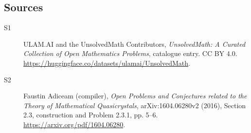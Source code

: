 \documentclass[11pt]{article}
\begin{document}
\subsection{Sources}
\begin{description}
\item[\hypertarget{source:statement:1}{S1}] ULAM.AI and the UnsolvedMath Contributors, \emph{UnsolvedMath: A Curated Collection of Open Mathematics Problems}, catalogue entry. CC BY 4.0. \url{https://huggingface.co/datasets/ulamai/UnsolvedMath}.
\item[\hypertarget{source:statement:2}{S2}] Faustin Adiceam (compiler), \emph{Open Problems and Conjectures related to the Theory of Mathematical Quasicrystals}, arXiv:1604.06280v2 (2016), Section 2.3, construction and Problem 2.3.1, pp. 5--6. \url{https://arxiv.org/pdf/1604.06280}.
\end{description}
\label{end:statement}
\end{document}

